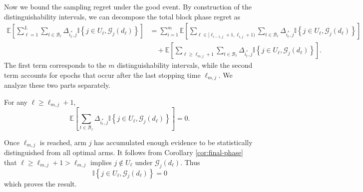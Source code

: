 \documentclass[opre,blindrev]{informs3}
\newcommand{\ind}[1]{\mathbb{I}\left\{#1\right\}}
\newcommand{\bE}[1]{{\mathbb{E}\left[#1\right]}}
\newcommand{\bP}[1]{{\mathbb{P}\left(#1\right)}}
\begin{document}
\begin{APPENDICES}

Now we bound the sampling regret under the good event. By construction of the distinguishability intervals, we can decompose the total block phase regret as
\begin{align*}
    \bE{\sum_{\ell =1}^L \sum_{t\in \mathcal{B}_\ell}\Delta_{i^*_t, j} \ind{j\in U_{\ell},\mathcal{G}_j(d_\ell)}}
    &= \sum_{i=1}^m \bE{\sum_{\ell\in [\ell_{i-1,j}+1, \ell_{i,j}+1)} \sum_{t\in \mathcal{B}_\ell}\Delta_{i^*_t, j} \ind{j\in U_{\ell},\mathcal{G}_j(d_\ell)}} \\
    &\quad + \bE{\sum_{\ell\geq \ell_{m,j}+1} \sum_{t\in \mathcal{B}_\ell}\Delta_{i^*_t, j} \ind{j\in U_{\ell},\mathcal{G}_j(d_\ell)}}.
\end{align*}
The first term corresponds to the \(m\) distinguishability intervals, while the second term accounts for epochs that occur after the last stopping time \(\ell_{m,j}\). 
We analyze these two parts separately.

\begin{lemma}\label{lem:arm-elimination}
    For any \(\ell \geq \ell_{m,j}+1\),
    \[
        \bE{\sum_{t\in \mathcal{B}_\ell}\Delta_{i^*_t, j} \ind{j\in U_{\ell},\mathcal{G}_j(d_\ell)}}=0.
    \]
\end{lemma}
    Once \(\ell_{m,j}\) is reached, arm \(j\) has accumulated enough evidence to be statistically distinguished from all optimal arms. It follows from Corollary \ref{cor:final-phase} that \(\ell \geq \ell_{m,j}+1>\ell_{m,j}\) implies \(j\not\in U_\ell\) under \(\mathcal{G}_j(d_\ell)\). Thus 
    \[\ind{j\in U_{\ell},\mathcal{G}_j(d_\ell)}=0\]
    which proves the result.
\Halmos  


\end{APPENDICES}
\end{document}
